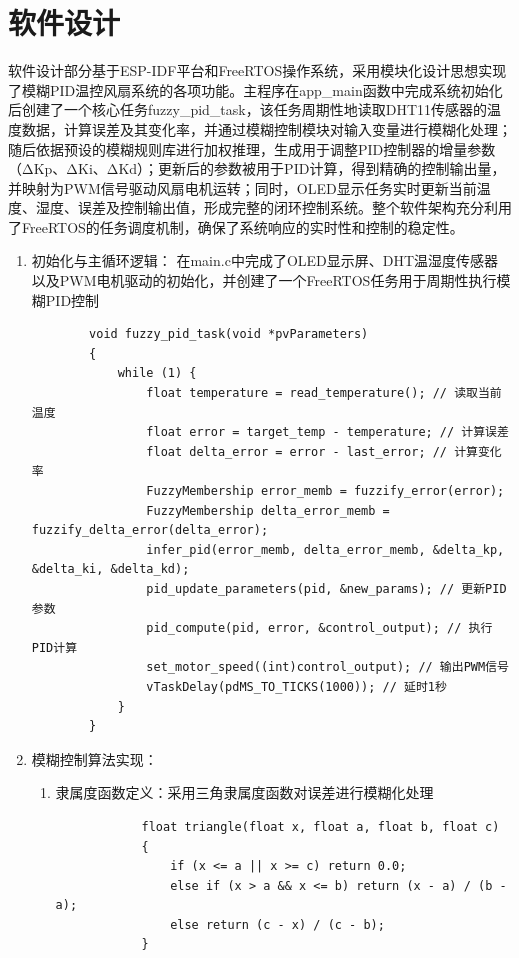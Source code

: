 \documentclass[UTF8]{ctexart}
\begin{document}
\section{软件设计}
软件设计部分基于ESP-IDF平台和FreeRTOS操作系统，采用模块化设计思想实现了模糊PID温控风扇系统的各项功能。主程序在app\_main函数中完成系统初始化后创建了一个核心任务fuzzy\_pid\_task，该任务周期性地读取DHT11传感器的温度数据，计算误差及其变化率，并通过模糊控制模块对输入变量进行模糊化处理；随后依据预设的模糊规则库进行加权推理，生成用于调整PID控制器的增量参数（ΔKp、ΔKi、ΔKd）；更新后的参数被用于PID计算，得到精确的控制输出量，并映射为PWM信号驱动风扇电机运转；同时，OLED显示任务实时更新当前温度、湿度、误差及控制输出值，形成完整的闭环控制系统。整个软件架构充分利用了FreeRTOS的任务调度机制，确保了系统响应的实时性和控制的稳定性。
\begin{enumerate}
	\item 初始化与主循环逻辑：
	在main.c中完成了OLED显示屏、DHT温湿度传感器以及PWM电机驱动的初始化，并创建了一个FreeRTOS任务用于周期性执行模糊PID控制
	\begin{lstlisting}
		void fuzzy_pid_task(void *pvParameters)
		{
			while (1) {
				float temperature = read_temperature(); // 读取当前温度
				float error = target_temp - temperature; // 计算误差
				float delta_error = error - last_error; // 计算变化率
				FuzzyMembership error_memb = fuzzify_error(error);
				FuzzyMembership delta_error_memb = fuzzify_delta_error(delta_error);
				infer_pid(error_memb, delta_error_memb, &delta_kp, &delta_ki, &delta_kd);
				pid_update_parameters(pid, &new_params); // 更新PID参数
				pid_compute(pid, error, &control_output); // 执行PID计算
				set_motor_speed((int)control_output); // 输出PWM信号
				vTaskDelay(pdMS_TO_TICKS(1000)); // 延时1秒
			}
		}
	\end{lstlisting}
	\item 模糊控制算法实现：
	\begin{enumerate}
		\item 隶属度函数定义：采用三角隶属度函数对误差进行模糊化处理
		\begin{lstlisting}
			float triangle(float x, float a, float b, float c)
			{
				if (x <= a || x >= c) return 0.0;
				else if (x > a && x <= b) return (x - a) / (b - a);
				else return (c - x) / (c - b);
			}
			

\end{lstlisting}
\end{enumerate}
\end{enumerate}
\end{document}
